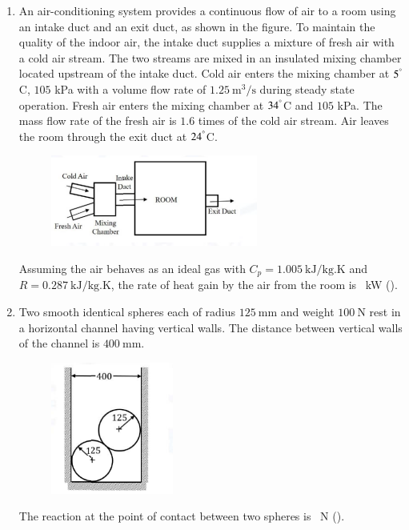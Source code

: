 \documentclass[journal]{IEEEtran}
\begin{document}
\begin{enumerate}
\hfill{}

\item An air-conditioning system provides a continuous flow of air to a room using an intake duct and an exit duct, as shown in the figure. To maintain the quality of the indoor air, the intake duct supplies a mixture of fresh air with a cold air stream. The two streams are mixed in an insulated mixing chamber located upstream of the intake duct. Cold air enters the mixing chamber at $5^\degree$C, $105$ kPa with a volume flow rate of $1.25~\text{m}^3/\text{s}$ during steady state operation. Fresh air enters the mixing chamber at $34^\degree$C and $105$ kPa. The mass flow rate of the fresh air is $1.6$ times of the cold air stream. Air leaves the room through the exit duct at $24^\degree$C.
\begin{figure}[h]
\centering
\includegraphics[width=0.5\columnwidth]{Figs/image (53).png}
\caption*{}
\label{fig:49}
\end{figure}
Assuming the air behaves as an ideal gas with $C_p = 1.005~\text{kJ/kg.K}$ and $R = 0.287~\text{kJ/kg.K}$, the rate of heat gain by the air from the room is \underline{\hspace{2cm}}~kW ().

\hfill{}

\item Two smooth identical spheres each of radius $125~\text{mm}$ and weight $100~\text{N}$ rest in a horizontal channel having vertical walls. The distance between vertical walls of the channel is $400~\text{mm}$.
\begin{figure}[h]
\centering
\includegraphics[width=0.5\columnwidth]{Figs/image (54).png}
\caption*{}
\label{fig:50}
\end{figure}
The reaction at the point of contact between two spheres is \underline{\hspace{2cm}}~N ().


\end{enumerate}
\end{document}

